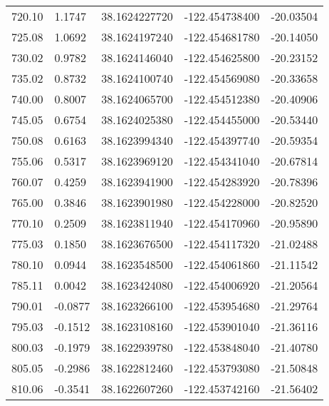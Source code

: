 \begin{scriptsize}
\begin{longtable}{p{2.5cm}p{2.5cm}p{3cm}p{3cm}p{2.5cm}}
           720.10  & 	 1.1747 &               38.1624227720  &   -122.454738400   &	-20.03504 \\
           725.08  & 	 1.0692 &               38.1624197240  &   -122.454681780   &	-20.14050 \\
           730.02  & 	 0.9782 &               38.1624146040  &   -122.454625800   &	-20.23152 \\
           735.02  & 	 0.8732 &               38.1624100740  &   -122.454569080   &	-20.33658 \\
           740.00  & 	 0.8007 &               38.1624065700  &   -122.454512380   &	-20.40906 \\
           745.05  & 	 0.6754 &               38.1624025380  &   -122.454455000   &	-20.53440 \\
           750.08  & 	 0.6163 &               38.1623994340  &   -122.454397740   &	-20.59354 \\
           755.06  & 	 0.5317 &               38.1623969120  &   -122.454341040   &	-20.67814 \\
           760.07  & 	 0.4259 &               38.1623941900  &   -122.454283920   &	-20.78396 \\
           765.00  & 	 0.3846 &               38.1623901980  &   -122.454228000   &	-20.82520 \\
           770.10  & 	 0.2509 &               38.1623811940  &   -122.454170960   &	-20.95890 \\
           775.03  & 	 0.1850 &               38.1623676500  &   -122.454117320   &	-21.02488 \\
           780.10  & 	 0.0944 &               38.1623548500  &   -122.454061860   &	-21.11542 \\
           785.11  & 	 0.0042 &               38.1623424080  &   -122.454006920   &	-21.20564 \\
           790.01  & 	-0.0877 &               38.1623266100  &   -122.453954680   &	-21.29764 \\
           795.03  & 	-0.1512 &               38.1623108160  &   -122.453901040   &	-21.36116 \\
           800.03  & 	-0.1979 &               38.1622939780  &   -122.453848040   &	-21.40780 \\
           805.05  & 	-0.2986 &               38.1622812460  &   -122.453793080   &	-21.50848 \\
           810.06  & 	-0.3541 &               38.1622607260  &   -122.453742160   &	-21.56402 \\

\end{longtable}
\end{scriptsize}
